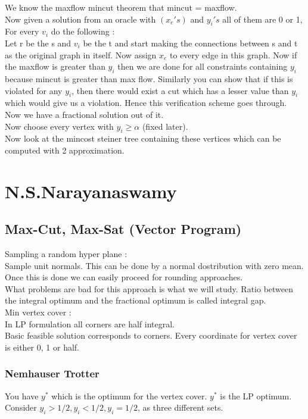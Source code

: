 \documentclass[solution,addpoints,12pt]{exam}
\begin{document}
We know the maxflow mincut theorem that mincut = maxflow.\\
Now given a solution from an oracle with $(x_e 's)$ and $y_i 's$
all of them are 0 or 1,
For every $v_i$ do the following :\\

Let r be the s and $v_i$ be the t and start making the connections between s and
t as the original graph in itself. Now assign $x_e$ to every edge in this graph.
Now if the maxflow is greater than $y_i$ then we are done for all constraints
containing $y_i$ because mincut is greater than max flow. Similarly you
can show that if this is violated for any $y_i$, then there would exist
a cut which has a lesser value than $y_i$ which would give us a violation.
Hence this verification scheme goes through.\\

Now we have a fractional solution out of it.\\
Now choose every vertex with $y_i \ge \alpha$ (fixed later).\\
Now look at the mincost steiner tree containing these vertices
which can be computed with 2 approximation.

\section{N.S.Narayanaswamy}

\subsection{Max-Cut, Max-Sat (Vector Program)}
Sampling a random hyper plane :\\
Sample unit normals. This can be done by a normal
dostribution with zero mean.\\
Once this is done we can easily proceed for rounding approaches.\\
What problems are bad for this approach is what we will study.
Ratio between the integral optimum and the fractional optimum is
called integral gap.\\

Min vertex cover :\\
In LP formulation all corners are half integral.\\
Basic feasible solution corresponds to corners. Every coordinate
for vertex cover is either 0, 1 or half.\\

\subsubsection{Nemhauser Trotter}
You have $y^*$ which is the optimum for the vertex cover.
$y^*$ is the LP optimum. Consider $y_i > 1/2, y_i < 1/2, y_i = 1/2$,
as three different sets.\\
\end{document}
